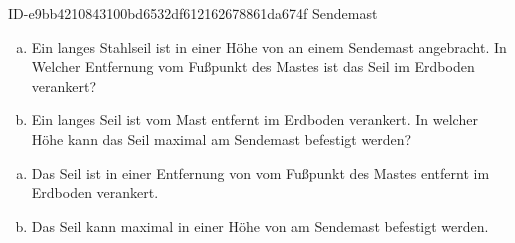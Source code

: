\begin{exercise}
      {ID-e9bb4210843100bd6532df612162678861da674f}
      {Sendemast}
  \ifproblem\problem
    \begin{enumerate}[a)]
      \item Ein  langes Stahlseil ist in einer Höhe von 
            an einem Sendemast angebracht. In Welcher Entfernung vom Fußpunkt des
            Mastes ist das Seil im Erdboden verankert?
      \item Ein  langes Seil ist  vom Mast entfernt im
            Erdboden verankert. In welcher Höhe kann das Seil maximal am Sendemast
            befestigt werden?
    \end{enumerate}
  \fi
  \ifoutcome\outcome
    \begin{enumerate}[a)]
      \item Das Seil ist in einer Entfernung von  vom Fußpunkt des
            Mastes entfernt im Erdboden verankert.
      \item Das Seil kann maximal in einer Höhe von  am Sendemast
            befestigt werden.
    \end{enumerate}
  \fi
\end{exercise}
